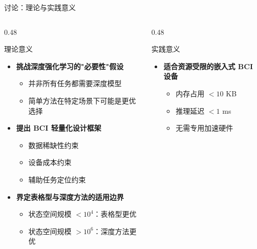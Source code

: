 \begin{frame}{讨论：理论与实践意义}
    \begin{columns}[T]
        \begin{column}{0.48\textwidth}
            \begin{block}{\normalsize {理论意义}}
                \begin{itemize}
                    \item \textbf{挑战深度强化学习的"必要性"假设}
                    \begin{itemize}
                        \item 并非所有任务都需要深度模型
                        \item 简单方法在特定场景下可能是更优选择
                    \end{itemize}

                    \item \textbf{提出 BCI 轻量化设计框架}
                    \begin{itemize}
                        \item 数据稀缺性约束
                        \item 设备成本约束
                        \item 辅助任务定位约束
                    \end{itemize}

                    \item \textbf{界定表格型与深度方法的适用边界}
                    \begin{itemize}
                        \item 状态空间规模 $< 10^4$：表格型更优
                        \item 状态空间规模 $> 10^6$：深度方法更优
                    \end{itemize}
                \end{itemize}
            \end{block}
        \end{column}

        \begin{column}{0.48\textwidth}
            \begin{block}{\normalsize {实践意义}}
                \begin{itemize}
                    \item \textbf{适合资源受限的嵌入式 BCI 设备}
                    \begin{itemize}
                        \item 内存占用 $< 10$ KB
                        \item 推理延迟 $< 1$ ms
                        \item 无需专用加速硬件
                    \end{itemize}


\end{itemize}
\end{block}
\end{column}
\end{columns}
\end{frame}

